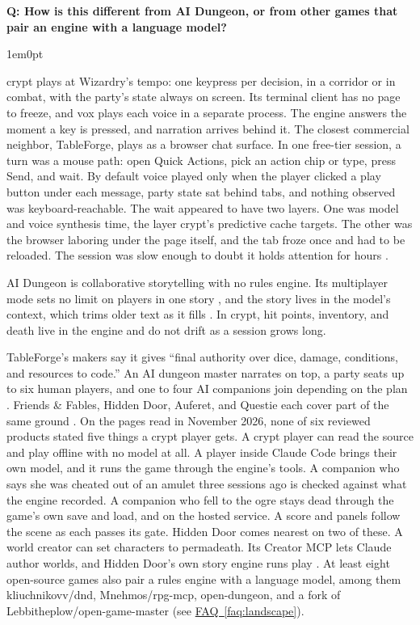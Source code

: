 \documentclass[11pt,letterpaper]{article}
\newcounter{faqnum}
\newenvironment{faqpair}[1]{%
  \needspace{4\baselineskip}\vspace{0.5em}\refstepcounter{faqnum}%
  \noindent\textbf{\color{SectionBlue}Q\thefaqnum: #1}\par\nopagebreak[4]%
  \vspace{0.2em}\begin{adjustwidth}{1em}{0pt}\setlength{\parindent}{0pt}%
}{\end{adjustwidth}\vspace{0.5em}}
\newcommand{\faqref}[1]{\hyperref[#1]{FAQ~\ref*{#1}}}
\begin{document}
\begin{faqpair}{How is this different from AI Dungeon, or from other games that pair an engine with a language model?}
crypt plays at Wizardry's tempo: one keypress per decision, in a corridor
or in combat, with the party's state always on screen. Its terminal client
has no page to freeze, and vox plays each voice in a separate process. The
engine answers the moment a key is pressed, and narration arrives behind
it. The closest commercial neighbor, TableForge, plays as a browser chat
surface. In one free-tier session, a turn was a mouse path: open Quick
Actions, pick an action chip or type, press Send, and wait. By default voice
played only when the player clicked a play button under each message, party
state sat behind tabs, and nothing observed was keyboard-reachable. The wait
appeared to have two layers. One was model and voice synthesis time, the layer crypt's
predictive cache targets. The other was the browser laboring under the
page itself, and the tab froze once and had to be reloaded. The session was
slow enough to doubt it holds attention for hours
\cite{freeman2026tableforgehandson}.

AI Dungeon is collaborative storytelling with no rules engine. Its
multiplayer mode sets no limit on players in one story
\cite{latitude2026multiplayerfaq}, and the story lives in the model's
context, which trims older text as it fills \cite{latitude2025help}. In
crypt, hit points, inventory, and death live in the engine and do not drift
as a session grows long.

TableForge's makers say it gives ``final authority over dice, damage,
conditions, and resources to code.''
An AI dungeon master narrates on top, a party seats up to six human
players, and one to four AI companions join depending on the plan
\cite{tableforge2026home,tableforge2026faq,tableforge2026multiplayercompare}.
Friends \& Fables, Hidden Door, Auferet, and Questie each cover part of the
same ground \cite{fables2026home,hiddendoor2026home,auferet2026multiplayer,questie2026partymode}.
On the pages read in November 2026, none of six reviewed products stated
five things a crypt player gets. A crypt player can read the source and
play offline with no model at all. A player inside Claude Code brings their
own model, and it runs the game through the engine's tools. A companion who
says she was cheated out of an amulet three sessions ago is checked against
what the engine recorded. A companion who fell to the ogre stays dead
through the game's own save and load, and on the hosted service. A score and panels follow the scene as each passes
its gate. Hidden Door comes nearest on two of these. A world creator can set
characters to permadeath. Its Creator MCP lets Claude author worlds, and
Hidden Door's own story engine runs play \cite{hiddendoor2026home}.
At least eight open-source games also pair a rules engine with a language
model, among them kliuchnikovv/dnd, Mnehmos/rpg-mcp, open-dungeon, and a
fork of Lebbitheplow/open-game-master
\cite{kliuchnikovv2026dnd,mnehmos2026rpgmcp,slowbutfast2026opendungeon,alecvlad2026opengamemaster}
(see \faqref{faq:landscape}).
\end{faqpair}
\end{document}
